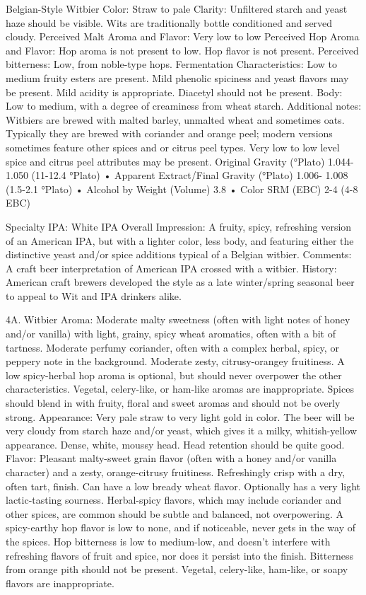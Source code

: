 \documentclass[a4paper,parskip=half]{scrartcl}
\begin{document}

Belgian-Style Witbier
Color: Straw to pale
Clarity: Unﬁltered starch and yeast haze should be
visible. Wits are traditionally bottle conditioned and
served cloudy.
Perceived Malt Aroma and Flavor: Very low to low
Perceived Hop Aroma and Flavor: Hop aroma is not
present to low. Hop flavor is not present.
Perceived bitterness: Low, from noble-type hops.
Fermentation Characteristics: Low to medium fruity
esters are present. Mild phenolic spiciness and yeast
ﬂavors may be present. Mild acidity is appropriate.
Diacetyl should not be present.
Body: Low to medium, with a degree of creaminess
from wheat starch.
Additional notes: Witbiers are brewed with malted
barley, unmalted wheat and sometimes oats.
Typically they are brewed with coriander and orange
peel; modern versions sometimes feature other
spices and or citrus peel types. Very low to low level
spice and citrus peel attributes may be present.
Original Gravity (°Plato) 1.044-1.050 (11-12.4 °Plato)
• Apparent Extract/Final Gravity (°Plato) 1.006-
1.008 (1.5-2.1 °Plato) • Alcohol by Weight (Volume)
3.8%
• Color SRM (EBC) 2-4 (4-8 EBC)
\parencite[24]{BA2021}

Specialty IPA: White IPA
Overall Impression: A fruity, spicy, refreshing version of an
American IPA, but with a lighter color, less body, and featuring
either the distinctive yeast and/or spice additions typical of a
Belgian witbier.
Comments: A craft beer interpretation of American IPA
crossed with a witbier.
History: American craft brewers developed the style as a late
winter/spring seasonal beer to appeal to Wit and IPA drinkers
alike.
\parencite[41]{BJCP2015}


4A. Witbier
Aroma: Moderate malty sweetness (often with light notes of
honey and/or vanilla) with light, grainy, spicy wheat aromatics,
often with a bit of tartness. Moderate perfumy coriander, often
with a complex herbal, spicy, or peppery note in the
background. Moderate zesty, citrusy-orangey fruitiness. A low
spicy-herbal hop aroma is optional, but should never
overpower the other characteristics. Vegetal, celery-like, or
ham-like aromas are inappropriate. Spices should blend in
with fruity, floral and sweet aromas and should not be overly
strong.
Appearance: Very pale straw to very light gold in color. The
beer will be very cloudy from starch haze and/or yeast, which
gives it a milky, whitish-yellow appearance. Dense, white,
moussy head. Head retention should be quite good.
Flavor: Pleasant malty-sweet grain flavor (often with a honey
and/or vanilla character) and a zesty, orange-citrusy fruitiness.
Refreshingly crisp with a dry, often tart, finish. Can have a low
bready wheat flavor. Optionally has a very light lactic-tasting
sourness. Herbal-spicy flavors, which may include coriander
and other spices, are common should be subtle and balanced,
not overpowering. A spicy-earthy hop flavor is low to none, and
if noticeable, never gets in the way of the spices. Hop bitterness
is low to medium-low, and doesn’t interfere with refreshing
flavors of fruit and spice, nor does it persist into the finish.
Bitterness from orange pith should not be present. Vegetal,
celery-like, ham-like, or soapy flavors are inappropriate.
\end{document}
